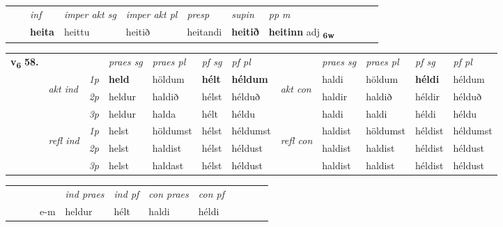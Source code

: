 \begin{tabular}{llllllllllll}
 & & \textit{inf} & \textit{imper akt sg} & \textit{imper akt pl}   & \textit{presp} & \textit{supin}  & \textit{pp m}     \\*
  & & \textbf{heita} & heittu  & heitið   & heitandi &  \textbf{heitið}  & \textbf{heitinn} adj \textbf{\textsubscript{6w}} \\*
\cmidrule{1-12}
\end{tabular}



\begin{tabular}{llllllllllll} \toprule
\multirow{4}{*}{{{\textbf{v{\textsubscript{6}}} \Large{\textbf{58.}}}}}  & &   &  \textit{praes sg}  & \textit{praes pl}  &\textit{ pf sg} & \textit{pf pl} &  &  \textit{praes sg}  & \textit{praes pl}  & \textit{pf sg} & \textit{pf pl } \\*
	\cmidrule{4-7} \cmidrule{9-12}
 & \multirow{3}{*}{\begin{turn}{90}\textit{akt ind}\end{turn}} & {\textit{1p}} & \textbf{held} & höldum    & \textbf{hélt} & \textbf{héldum} & \multirow{3}{*}{\begin{turn}{90}\textit{akt con}\end{turn}} &haldi & höldum & \textbf{héldi} & héldum\\*
& &  {\textit{2p}} &  heldur  & haldið   & hélst & hélduð & & haldir & haldið & héldir & hélduð \\*
& &  {\textit{3p}} & heldur & halda   & hélt & héldu & & haldi & haldi& héldi & héldu  \\*
\cmidrule{4-7} \cmidrule{9-12}
 &\multirow{3}{*}{\begin{turn}{90}\textit{refl ind}\end{turn}} & {\textit{1p}} & helst & höldumst    & hélst & héldumst & \multirow{3}{*}{\begin{turn}{90}\textit{refl con}\end{turn}}  &haldist & höldumst & héldist & héldumst\\*
 &&  {\textit{2p}} &  helst  & haldist   & hélst & héldust & &haldist & haldist & héldist & héldust \\*
& &  {\textit{3p}} & helst & haldast   & hélst & héldust & & haldist & haldist& héldist & héldust  \\*
\cmidrule{4-7} \cmidrule{9-12}
\end{tabular}


\begin{tabular}{llllllllllll}
 & &  & &  \textit{ind praes} & \textit{ind pf} & \textit{con praes} & \textit{con pf} \\*
&  & & e-m & heldur & hélt & haldi & héldi \\*
\cmidrule{5-9}
\end{tabular}



